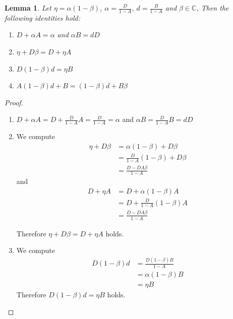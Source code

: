 \documentclass[reqno]{amsart}
\newtheorem{lemma}{Lemma}
\theoremstyle{remark}
\theoremstyle{Definition}
\theoremstyle{remark}
\numberwithin{equation}{section}
\begin{document}
\begin{lemma}\label{l1}Let $\eta= \alpha(1-\beta)$, $\alpha=\frac{D}{1-A}$, $d=\frac{B}{1-A}$ and $\beta \in \mathbb{C}$, Then the following  identities hold:
\begin{enumerate}
\item $D+\alpha A = \alpha$ and $\alpha B= dD$
\item $\eta+D\beta= D+\eta A$ 
\item $D(1-\beta)d= \eta B$ 
\item $ A(1-\beta)d+B= (1-\beta)d+B\beta$
\end{enumerate}
\end{lemma}
\begin{proof}
    
       \begin{enumerate}
           \item $D+\alpha A= D+\frac{D}{1-A}A=\frac{D}{1-A}=\alpha$ and $\alpha B= \frac{D}{1-A} B= dD$\\
       \item We compute
       \begin{align*}
            \eta+D\beta &= \alpha(1-\beta)+D\beta\\
            &=\frac{D}{1-A}(1-\beta)+D\beta\\
            &= \frac{D-DA\beta}{1-A}
        \end{align*}  
        and
            \begin{align*}
            D+\eta A &= D+\alpha (1-\beta)A\\
            &= D+\frac{D}{1-A}(1-\beta)A\\
            &=\frac{D-DA\beta}{1-A}
        \end{align*}
        
        Therefore $\eta+D\beta= D+\eta A$ holds.\\
        \item  We compute
        \begin{align*}
        D(1-\beta)d &= \frac{D(1-\beta)B}{1-A}\\
        &= \alpha(1-\beta)B\\
        &= \eta B 
        \end{align*}
    Therefore $D(1-\beta)d= \eta B$ holds.\\
    

\end{enumerate}
\end{proof}
\end{document}
